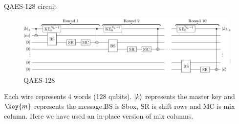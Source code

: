 \begin{frame}{QAES-128 circuit}
    \begin{figure}[h!]
    \centering
    \includegraphics[width=\linewidth]{aes/aesfull.png}
    \caption{QAES-128 \cite{aeslowmc}}
    \label{fig:aesfull}
\end{figure}
Each wire represents 4 words (128 qubits). \pause $\ket{k}$ represents the master key and $\key{m}$ represents the message.\pause BS is Sbox, \pause SR is shift rows and \pause MC is mix column. Here we have used an in-place version of mix columns.
\begin{center}
\begin{table}[h!]
    \centering
    \caption{QAES-128 cost of both variants of mix columns}
    \label{tab:aescost}
\end{table}
\end{center}
\end{frame}
